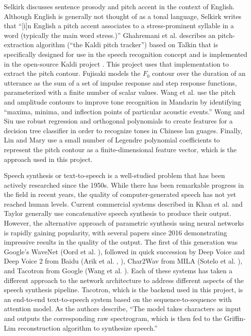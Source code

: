 \documentclass{article}
\begin{document}
Selkirk \cite{selkirk1995sentence} discusses sentence prosody and pitch accent in the context of English. Although English is generally not thought of as a tonal language, Selkirk writes that ``[i]n English a pitch accent associates to a stress-prominent syllable in a word (typically the main word stress.)''
Ghahremani et al. \cite{ghahremani2014pitch} describes an pitch-extraction algorithm (``the Kaldi pitch tracker'') based on Talkin \cite{talkin1995robust} that is specifically designed for use in the speech recognition concept and is implemented in the open-source Kaldi project \cite{Povey_ASRU2011}. This project uses that implementation to extract the pitch contour.
Fujisaki \cite{fujisaki2004information} models the $F_0$ contour over the duration of an utterance as the sum of a set of impulse response and step response functions, parameterized with a finite number of scalar values.
Wang et al. \cite{wang2008mandarin} use the pitch and amplitude contours to improve tone recognition in Mandarin by identifying ``maxima, minima, and inflection points of particular acoustic events.''
Wong and Siu \cite{pui2004decision} use robust regression and orthogonal polynomials to create features for a decision tree classifier in order to recognize tones in Chinese lan guages. Finally, Lin \cite{lin2005language} and Mary \cite{mary2011extraction} use a small number of Legendre polynomial coefficients to represent the pitch contour as a finite-dimensional feature vector, which is the approach used in this project.

Speech synthesis or text-to-speech is a well-studied problem that has been actively researched since the 1950s. While there has been remarkable progress in the field in recent years, the quality of computer-generated speech has not yet reached human levels. Current commercial systems described in Khan et al. \cite{khan2016concatenative} and Taylor  \cite{taylor2009text} generally use concatenative speech synthesis to produce their output. However, the alternative approach of parametric synthesis using neural networks is rapidly gaining popularity, with several papers since 2016 demonstrating impressive results in the quality of the output.
The first of this generation was Google's WaveNet (Oord et al. \cite{oord2016wavenet}), followed in quick succession by Deep Voice and Deep Voice 2 from Baidu (Arik et al. \cite{arik2017deep}, \cite{arik2017deep2}), Char2Wav from MILA (Sotelo et al. \cite{sotelo2017char2wav}), and Tacotron from Google (Wang et al. \cite{wang2017tacotron}).
Each of these systems has taken a different approach to the network architecture to address different aspects of the speech synthesis pipeline. Tacotron, which is the backend used in this project, is an end-to-end text-to-speech system based on the sequence-to-sequence with attention model. As the authors describe, ``The model takes characters as input and outputs the corresponding raw spectrogram, which is then fed to the Griffin-Lim reconstruction algorithm to synthesize speech.''
\end{document}
